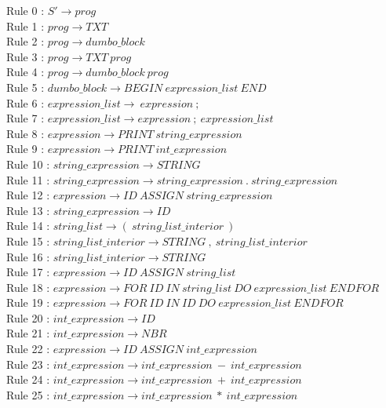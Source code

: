 \documentclass[report,10pt,a4paper]{memoir}
\begin{document}
\begin{flushleft}
Rule 0 : $S' \rightarrow prog$\\
Rule 1 : $prog \rightarrow TXT$\\
Rule 2 : $prog \rightarrow dumbo\_block$\\
Rule 3 : $prog \rightarrow TXT\ prog$\\
Rule 4 : $prog \rightarrow dumbo\_block\ prog$\\
Rule 5 : $dumbo\_block \rightarrow BEGIN\ expression\_list\ END$\\
Rule 6 : $expression\_list \rightarrow\ expression\ ;$\\
Rule 7 : $expression\_list \rightarrow expression\ ;\ expression\_list$\\
Rule 8 : $expression \rightarrow PRINT\ string\_expression$\\
Rule 9 : $expression \rightarrow PRINT\ int\_expression$\\
Rule 10 : $string\_expression \rightarrow STRING$\\
Rule 11 : $string\_expression \rightarrow string\_expression\ .\ string\_expression$\\
Rule 12 : $expression \rightarrow ID\ ASSIGN\ string\_expression$\\
Rule 13 : $string\_expression \rightarrow ID$\\
Rule 14 : $string\_list \rightarrow (\ string\_list\_interior\ )$\\
Rule 15 : $string\_list\_interior \rightarrow STRING\ ,\ string\_list\_interior$\\
Rule 16 : $string\_list\_interior \rightarrow STRING$\\
Rule 17 : $expression \rightarrow ID\ ASSIGN\ string\_list$\\
Rule 18 : $expression \rightarrow FOR\ ID\ IN\ string\_list\ DO\ expression\_list\ ENDFOR$\\
Rule 19 : $expression \rightarrow FOR\ ID\ IN\ ID\ DO\ expression\_list\ ENDFOR$\\
Rule 20 : $int\_expression \rightarrow ID$\\
Rule 21 : $int\_expression \rightarrow NBR$\\
Rule 22 : $expression \rightarrow ID\ ASSIGN\ int\_expression$\\
Rule 23 : $int\_expression \rightarrow int\_expression\ -\ int\_expression$\\
Rule 24 : $int\_expression \rightarrow int\_expression\ +\ int\_expression$\\
Rule 25 : $int\_expression \rightarrow int\_expression\ *\ int\_expression$\\

\end{flushleft}
\end{document}
